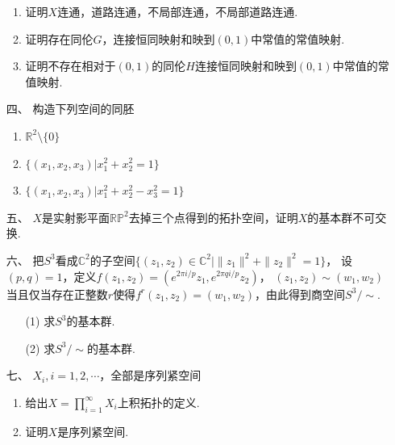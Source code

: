 \begin{enumerate}
\begin{enumerate}
    \item 证明$X$连通，道路连通，不局部连通，不局部道路连通.
    \item 证明存在同伦$G$，连接恒同映射和映到$(0,1)$中常值的常值映射.
    \item 证明不存在相对于$(0,1)$的同伦$H$连接恒同映射和映到$(0,1)$中常值的常值映射.
\end{enumerate}
\item[四、]构造下列空间的同胚\\
\begin{enumerate}
    \item $\mathbb{R}^2\setminus\{0\}$
    \item $\{(x_1,x_2,x_3)|x_1^2+x_2^2=1\}$
    \item $\{(x_1,x_2,x_3)|x_1^2+x_2^2-x_3^2=1\}$
\end{enumerate}
\item[五、]$X$是实射影平面$\mathbb{RP}^2$去掉三个点得到的拓扑空间，证明$X$的基本群不可交换.
\item[六、]把$S^3$看成$\mathbb{C}^2$的子空间$\{(z_1,z_2)\in\mathbb{C}^2|\|z_1\|^2+\|z_2\|^2=1\}$，
设$(p,q)=1$，定义$f(z_1,z_2)=(e^{2\pi i/p}z_1,e^{2\pi q i/p}z_2)$，
$(z_1,z_2)\sim (w_1,w_2)$当且仅当存在正整数$r$使得$f^r(z_1,z_2)=(w_1,w_2)$，由此得到商空间$S^3/\sim$.
\begin{enumerate}
    \item[(1)]求$S^3$的基本群.
    \item[(2)]求$S^3/\sim$的基本群.
\end{enumerate}
\item[七、]$X_i,i=1,2,\cdots$，全部是序列紧空间
\begin{enumerate}
    \item 给出$X=\prod\limits_{i=1}^{\infty}X_i$上积拓扑的定义.
    \item 证明$X$是序列紧空间.
\end{enumerate}
\end{enumerate}
